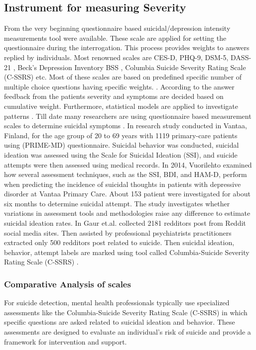 \documentclass[sn-mathphys,Numbered]{sn-jnl}%
\theoremstyle{thmstyleone}%
\theoremstyle{thmstyletwo}%
\theoremstyle{thmstylethree}%
\begin{document}
\subsection{Instrument for measuring Severity}
From the very beginning questionnaire based suicidal/depression intensity measurements tool were available. These scale are applied for setting the questionnaire during the interrogation. This process provides weights to answers replied by individuals. Most renowned scales are CES-D, PHQ-9, DSM-5, DASS-21 \cite{radloff1977ces, havigerova2019text}, Beck's Depression Inventory BSS \cite{beck2000weisman}, Columbia Suicide Severity Rating Scale (C-SSRS) \cite{posner2011columbia, joiner1997modified} etc. Most of these scales are based on predefined specific number of multiple choice questions having specific weights. \cite{havigerova2019text, beck1961inventory, kroenke2001phq, tolentino2018dsm, kliem2017german, eke2010hamilton}. According to the answer feedback from the patients severity and symptoms are decided based on cumulative weight. Furthermore, statistical models are applied to investigate patterns \cite{shen2020detecting, shen2017depression}.  Till date many researchers are using questionnaire based measurement scales to determine suicidal symptoms \cite{li2022association}. In \cite{vuorilehto2006suicidal} research study conducted in Vantaa, Finland, for the age group of 20 to 69 years with 1119 primary-care patients using (PRIME-MD) questionnaire. Suicidal behavior was conducted, suicidal ideation was assessed using the Scale for Suicidal Ideation (SSI), and suicide attempts were then assessed using medical records. In 2014, Vuorilehto \cite{vuorilehto2014method} examined how several assessment techniques, such as the SSI, BDI, and HAM-D, perform when predicting the incidence of suicidal thoughts in patients with depressive disorder at Vantaa Primary Care. About 153 patient were investigated for about six months to determine suicidal attempt. The study investigates whether variations in assessment tools and methodologies raise any difference to estimate suicidal ideation rates. In \cite{gaur2019knowledge} Gaur et.al. collected 2181 redditors post from Reddit social media sites. Then assisted by professional psychiatrists practitioners extracted only 500 redditors post related to suicide. Then suicidal ideation, behavior, attempt labels are marked using tool called Columbia-Suicide Severity Rating Scale (C-SSRS) \cite{posner2011columbia}. 

\subsubsection{Comparative Analysis of scales}
For suicide detection, mental health professionals typically use specialized assessments like the Columbia-Suicide Severity Rating Scale (C-SSRS) in which specific questions are asked related to suicidal ideation and behavior. These assessments are designed to evaluate an individual's risk of suicide and provide a framework for intervention and support.
\end{document}
